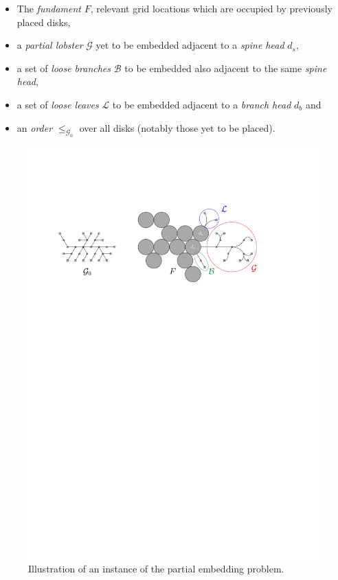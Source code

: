 \documentclass[draft,final]{vutinfth} %
\begin{document}
\begin{itemize}
    \item The \emph{fundament} $F$, relevant grid locations which are occupied by previously placed disks,
    \item a \emph{partial lobster} $\mathcal G$ yet to be embedded adjacent to a \emph{spine head} $d_s$,
    \item a set of \emph{loose branches} $\mathcal B$ to be embedded also adjacent to the same \emph{spine head},
    \item a set of \emph{loose leaves} $\mathcal L$ to be embedded adjacent to a \emph{branch head} $d_b$ and
    \item an \emph{order} $\leq_{\mathcal G_0}$ over all disks (notably those yet to be placed).
\end{itemize}

\begin{figure}[h]
    \centering
    \includegraphics{graphics/dp-problem.pdf}
    \caption{Illustration of an instance of the partial embedding problem.}
    \label{fig:dp-problem}
\end{figure}
\end{document}
